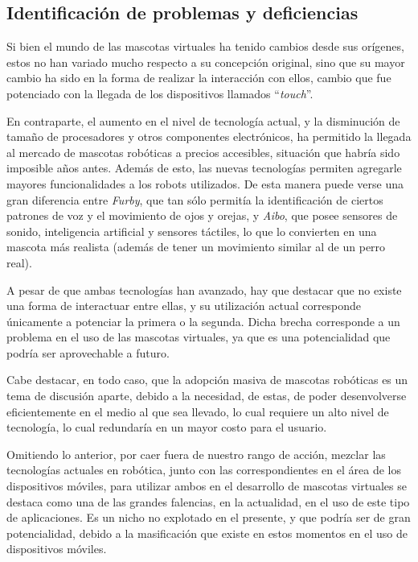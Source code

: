 \subsection{Identificaci\'on de problemas y deficiencias}

Si bien el mundo de las mascotas virtuales ha tenido cambios desde sus or\'igenes, estos no han variado mucho respecto a su concepci\'on original, sino que su mayor cambio ha sido en la forma de realizar la interacci\'on con ellos, cambio que fue potenciado con la llegada de los dispositivos llamados ``\emph{touch}''.

En contraparte, el aumento en el nivel de tecnolog\'ia actual, y la disminuci\'on de tama\~no de procesadores y otros componentes electr\'onicos, ha permitido la llegada al mercado de mascotas rob\'oticas a precios accesibles, situaci\'on que habr\'ia sido imposible a\~nos antes. Adem\'as de esto, las nuevas tecnolog\'ias permiten agregarle mayores funcionalidades a los robots utilizados. De esta manera puede verse una gran diferencia entre \emph{Furby}, que tan s\'olo permit\'ia la identificaci\'on de ciertos patrones de voz y el movimiento de ojos y orejas, y \emph{Aibo}, que posee sensores de sonido, inteligencia artificial y sensores t\'actiles, lo que lo convierten en una mascota m\'as realista (adem\'as de tener un movimiento similar al de un perro real).

A pesar de que ambas tecnolog\'ias han avanzado, hay que destacar que no existe una forma de interactuar entre ellas, y su utilizaci\'on actual corresponde \'unicamente a potenciar la primera o la segunda. Dicha brecha corresponde a un problema en el uso de las mascotas virtuales, ya que es una potencialidad que podr\'ia ser aprovechable a futuro.

Cabe destacar, en todo caso, que la adopci\'on masiva de mascotas rob\'oticas es un tema de discusi\'on aparte, debido a la necesidad, de estas, de poder desenvolverse eficientemente en el medio al que sea llevado, lo cual requiere un alto nivel de tecnolog\'ia, lo cual redundar\'ia en un mayor costo para el usuario.

Omitiendo lo anterior, por caer fuera de nuestro rango de acci\'on, mezclar las tecnolog\'ias actuales en rob\'otica, junto con las correspondientes en el \'area de los dispositivos m\'oviles, para utilizar ambos en el desarrollo de mascotas virtuales se destaca como una de las grandes falencias, en la actualidad, en el uso de este tipo de aplicaciones. Es un nicho no explotado en el presente, y que podr\'ia ser de gran potencialidad, debido a la masificaci\'on que existe en estos momentos en el uso de dispositivos m\'oviles.

